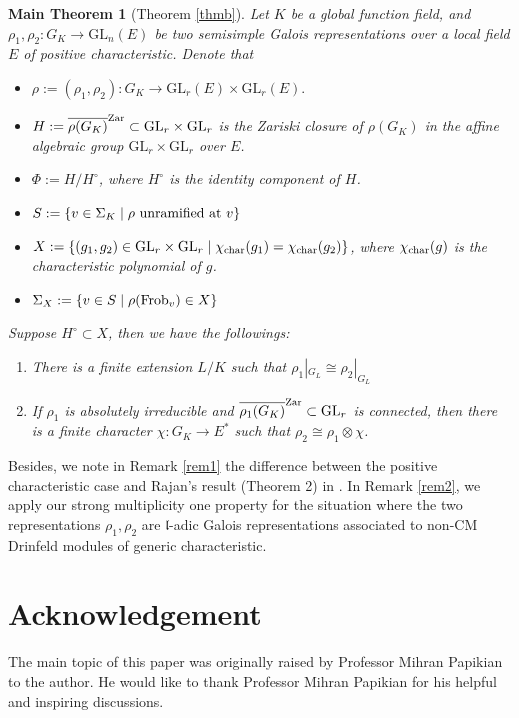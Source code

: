 \documentclass[20pt, oneside]{article}   	%
\newtheorem{thmm}{Main Theorem}
\theoremstyle{definition}
\newcommand{\fl}{\mathfrak{l}}
\newcommand{\GL}{\mathrm{GL}}
\begin{document}
\begin{thmm}[Theorem \ref{thmb}]
Let $K$ be a global function field, and  $\rho_1,\rho_2:G_K\rightarrow \GL_n(E)$ be two semisimple Galois representations over a local field $E$ of positive characteristic. Denote that
\begin{itemize}
\item $\rho:=(\rho_1,\rho_2):G_K\rightarrow \GL_r(E)\times\GL_r(E).$
\item$ H:=\overline{\rho(G_K)}^{\rm Zar}\subset \GL_r\times\GL_r$ is the Zariski closure of $\rho(G_K)$ in the affine algebraic group $\GL_r\times\GL_r$ over $E$.
\item $\Phi:=H/H^\circ$, where $H^\circ$ is the identity component of $H$.
\item $S:=\{v\in\Sigma_K\mid \rho\ {\rm unramified\ at\ }v\}$
\item$X:=\left\{(g_1,g_2)\in \GL_r\times\GL_r\mid \chi_{\rm char}(g_1)=\chi_{\rm char}(g_2) \right\}$, where $\chi_{\rm char}(g)$ is the characteristic polynomial of $g$. 
\item $\Sigma_X:=\{v\in S\mid \rho({\rm Frob}_v)\in X\}$
\end{itemize}

Suppose $H^\circ\subset X$, then we have the followings:
\begin{enumerate}
\item[(i)] There is a finite extension $L/K$ such that $\rho_1|_{G_L}\cong\rho_2|_{G_L}$
\item[(ii)]  If $\rho_1$ is absolutely irreducible and $\overline{\rho_1(G_K)}^{\rm Zar}\subset \GL_r$ is connected, then there is a finite character $\chi:G_K\rightarrow E^*$ such that $\rho_2\cong\rho_1\otimes \chi$.
\end{enumerate}
\end{thmm}

Besides, we note in Remark \ref{rem1} the difference between the positive characteristic case and Rajan's result (Theorem 2) in \cite{Ra98}. In Remark \ref{rem2}, we apply our strong multiplicity one property for the situation where the two representations $\rho_1, \rho_2$ are $\fl$-adic Galois representations associated to non-CM Drinfeld modules of generic characteristic. 

\section*{Acknowledgement}

The main topic of this paper was originally raised by Professor Mihran Papikian to the author. He would like to thank Professor Mihran Papikian  for his helpful and inspiring discussions.
\end{document}
